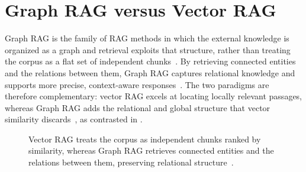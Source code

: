 \section{Graph RAG versus Vector RAG}
\label{sec:gr-graphrag-vs-vectorrag}

Graph RAG is the family of RAG methods in which the external knowledge is
organized as a graph and retrieval exploits that structure, rather than treating
the corpus as a flat set of independent chunks~\cite{peng2024graphrag}. By
retrieving connected entities and the relations between them, Graph RAG captures
relational knowledge and supports more precise, context-aware
responses~\cite{peng2024graphrag}. The two paradigms are therefore complementary:
vector RAG excels at locating locally relevant passages, whereas Graph RAG adds
the relational and global structure that vector similarity
discards~\cite{peng2024graphrag, edge2024graphrag}, as contrasted in
.

\begin{figure}[htbp]
  \centering
  \caption[Vector RAG versus Graph RAG]{Vector RAG treats the corpus as independent chunks ranked by
    similarity, whereas Graph RAG retrieves connected entities and the relations
    between them, preserving relational structure~\cite{peng2024graphrag}.}
  \label{fig:gr-vector-vs-graph}
\end{figure}

